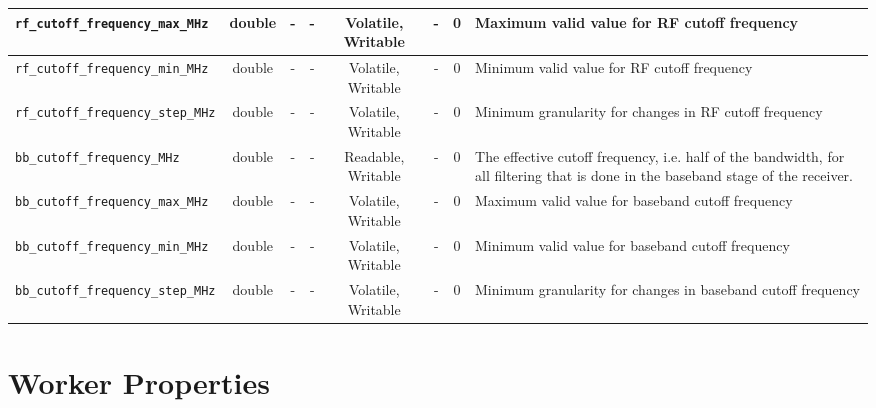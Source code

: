 \documentclass{article}
\begin{document}
\begin{landscape}
\begin{scriptsize}
\begin{tabular}{|p{4cm}|c|c|c|c|c|c|p{8cm}|}
			\hline
			\verb+rf_cutoff_frequency_max_MHz+  & double & -        & -          & Volatile, Writable & -           & 0       & Maximum valid value for RF cutoff frequency                                                \\
			\hline
			\verb+rf_cutoff_frequency_min_MHz+  & double & -        & -          & Volatile, Writable & -           & 0       & Minimum valid value for RF cutoff frequency                                                \\
			\hline
			\verb+rf_cutoff_frequency_step_MHz+ & double & -        & -          & Volatile, Writable & -           & 0       & Minimum granularity for changes in RF cutoff frequency                                     \\
			\hline
			\verb+bb_cutoff_frequency_MHz+      & double & -        & -          & Readable, Writable  & -           & 0       & The effective cutoff frequency, i.e. half of the bandwidth, for all filtering that is done in the baseband stage of the receiver.\\
			\hline
			\verb+bb_cutoff_frequency_max_MHz+  & double & -        & -          & Volatile, Writable & -           & 0       & Maximum valid value for baseband cutoff frequency                                          \\
			\hline
			\verb+bb_cutoff_frequency_min_MHz+  & double & -        & -          & Volatile, Writable & -           & 0       & Minimum valid value for baseband cutoff frequency                                          \\
			\hline
			\verb+bb_cutoff_frequency_step_MHz+ & double & -        & -          & Volatile, Writable & -           & 0       & Minimum granularity for changes in baseband cutoff frequency                               \\
			\hline
		\end{tabular}
	\end{scriptsize}

	\section*{Worker Properties}

\end{landscape}
\end{document}
